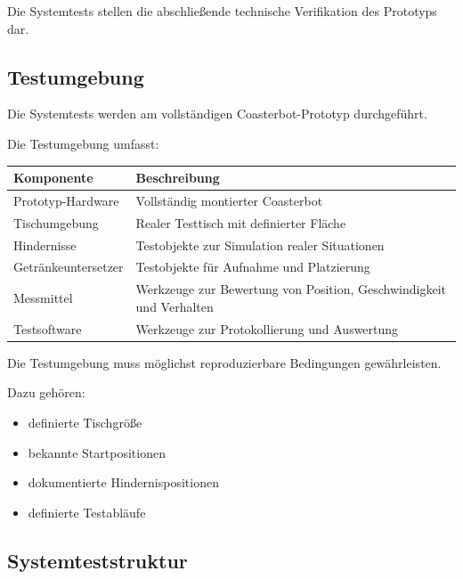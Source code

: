 \documentclass[
  a4paper,
  12pt,
  DIV=12,        %
  parskip=half,  %
  headings=small %
]{scrartcl}
\theoremstyle{definition}
\providecommand{\tightlist}{%
  \setlength{\itemsep}{0pt}\setlength{\parskip}{0pt}}
\theoremstyle{definition}
\begin{document}
Die Systemtests stellen die abschließende technische Verifikation des
Prototyps dar.

\subsection{Testumgebung}\label{testumgebung-1}

Die Systemtests werden am vollständigen Coasterbot-Prototyp
durchgeführt.

Die Testumgebung umfasst:

\begin{longtable}[]{@{}
  >{\raggedright\arraybackslash}p{}
  >{\raggedright\arraybackslash}p{}@{}}
\toprule\noalign{}
\begin{minipage}[b]{\linewidth}\raggedright
Komponente
\end{minipage} & \begin{minipage}[b]{\linewidth}\raggedright
Beschreibung
\end{minipage} \\
\midrule\noalign{}
\endhead
\bottomrule\noalign{}
\endlastfoot
Prototyp-Hardware & Vollständig montierter Coasterbot \\
Tischumgebung & Realer Testtisch mit definierter Fläche \\
Hindernisse & Testobjekte zur Simulation realer Situationen \\
Getränkeuntersetzer & Testobjekte für Aufnahme und Platzierung \\
Messmittel & Werkzeuge zur Bewertung von Position, Geschwindigkeit und
Verhalten \\
Testsoftware & Werkzeuge zur Protokollierung und Auswertung \\
\end{longtable}

Die Testumgebung muss möglichst reproduzierbare Bedingungen
gewährleisten.

Dazu gehören:

\begin{itemize}
\tightlist
\item
  definierte Tischgröße
\item
  bekannte Startpositionen
\item
  dokumentierte Hindernispositionen
\item
  definierte Testabläufe
\end{itemize}

\subsection{Systemteststruktur}\label{systemteststruktur}
\end{document}
